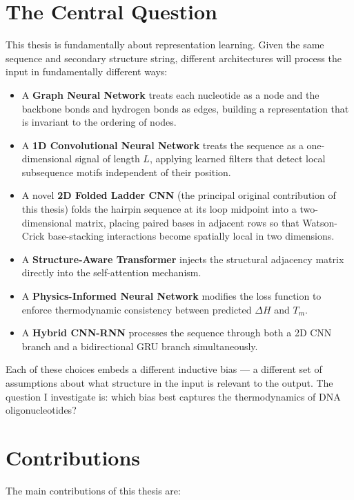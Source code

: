 \documentclass[12pt,oneside,letterpaper]{report}
\begin{document}
\section{The Central Question}

This thesis is fundamentally about representation learning. Given the same sequence and secondary structure string, different architectures will process the input in fundamentally different ways:

\begin{itemize}
    \item A \textbf{Graph Neural Network} treats each nucleotide as a node and the backbone bonds and hydrogen bonds as edges, building a representation that is invariant to the ordering of nodes.
    \item A \textbf{1D Convolutional Neural Network} treats the sequence as a one-dimensional signal of length $L$, applying learned filters that detect local subsequence motifs independent of their position.
    \item A novel \textbf{2D Folded Ladder CNN} (the principal original contribution of this thesis) folds the hairpin sequence at its loop midpoint into a two-dimensional matrix, placing paired bases in adjacent rows so that Watson-Crick base-stacking interactions become spatially local in two dimensions.
    \item A \textbf{Structure-Aware Transformer} injects the structural adjacency matrix directly into the self-attention mechanism.
    \item A \textbf{Physics-Informed Neural Network} modifies the loss function to enforce thermodynamic consistency between predicted $\Delta H$ and $T_m$.
    \item A \textbf{Hybrid CNN-RNN} processes the sequence through both a 2D CNN branch and a bidirectional GRU branch simultaneously.
\end{itemize}

Each of these choices embeds a different inductive bias --- a different set of assumptions about what structure in the input is relevant to the output. The question I investigate is: which bias best captures the thermodynamics of DNA oligonucleotides?

\section{Contributions}

The main contributions of this thesis are:
\end{document}
